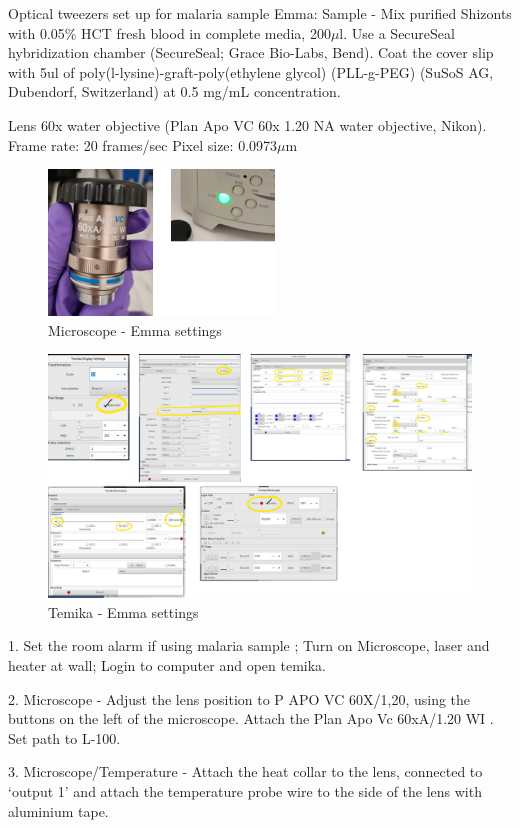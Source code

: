 \documentclass{report}
\begin{document}
Optical tweezers set up for malaria sample
Emma: Sample - Mix purified Shizonts with 0.05\% HCT fresh blood in complete media, 200$\mu$l. Use a SecureSeal hybridization chamber (SecureSeal; Grace Bio-Labs, Bend). Coat the cover slip with 5ul of poly(l-lysine)-graft-poly(ethylene glycol) (PLL-g-PEG) (SuSoS AG, Dubendorf, Switzerland) at 0.5 mg/mL concentration.

 Lens  60x water objective (Plan Apo VC 60x 1.20 NA water objective, Nikon).
    Frame rate: 20 frames/sec
    Pixel size:  0.0973$\mu$m


\begin{figure}[h]
		\includegraphics[width=6cm]{fig1}
		\caption{Microscope - Emma settings}
\end{figure}

\begin{figure}[h]
		\includegraphics[width=\textwidth]{fig2}
		\caption{Temika - Emma settings}
\end{figure}


1.    Set the room alarm if using malaria sample ;    Turn on Microscope, laser and heater at wall;    Login to computer and open temika.

2.    Microscope - Adjust the lens position to P APO VC 60X/1,20, using the buttons on the left of the microscope. Attach the Plan Apo Vc 60xA/1.20 WI .   Set path to L-100.

3.    Microscope/Temperature - Attach the heat collar to the lens, connected to `output 1' and attach the temperature probe wire to the side of the lens with aluminium tape.
\end{document}
